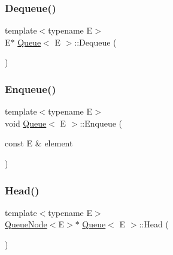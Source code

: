 \subsubsection{\texorpdfstring{Dequeue()}{Dequeue()}}
{\footnotesize\ttfamily template$<$typename E$>$ \\
E$\ast$ \hyperlink{class_queue}{Queue}$<$ E $>$\+::Dequeue (\begin{DoxyParamCaption}{ }\end{DoxyParamCaption})\hspace{0.3cm}{\ttfamily [inline]}}

\mbox{\label{class_queue_abaa2e7175457307bca74f5562cbdaaa9}} 
\subsubsection{\texorpdfstring{Enqueue()}{Enqueue()}}
{\footnotesize\ttfamily template$<$typename E$>$ \\
void \hyperlink{class_queue}{Queue}$<$ E $>$\+::Enqueue (\begin{DoxyParamCaption}\item[{const E \&}]{element }\end{DoxyParamCaption})\hspace{0.3cm}{\ttfamily [inline]}}

\mbox{\label{class_queue_a71aa0154ef75bb87a53b6af1829fcd5e}} 
\subsubsection{\texorpdfstring{Head()}{Head()}\hspace{0.1cm}{\footnotesize\ttfamily [1/2]}}
{\footnotesize\ttfamily template$<$typename E$>$ \\
\hyperlink{class_queue_node}{Queue\+Node}$<$E$>$$\ast$ \hyperlink{class_queue}{Queue}$<$ E $>$\+::Head (\begin{DoxyParamCaption}{ }\end{DoxyParamCaption})\hspace{0.3cm}{\ttfamily [inline]}}

\mbox{\label{class_queue_a6c906075e0ad2d1f0634990aa106395e}} 
